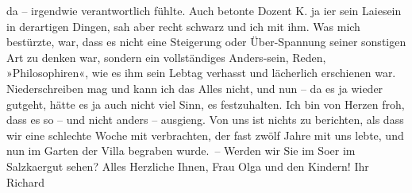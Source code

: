 \begin{ledgroupsized}[t]{13cm}
               da – irgendwie verantwortlich fühlte. Auch betonte Dozent K. ja i{\geminationm}er sein Laiesein in
               derartigen Dingen, sah aber recht schwarz {\pb}und ich mit ihm. Was mich
               bestürzte, war, dass es nicht eine Steigerung oder Über-Spannung seiner sonstigen Art
               zu denken war, sondern ein vollständiges Anders-sein, Reden, »Philosophiren«, wie es
               ihm sein Lebtag verhasst und lächerlich erschienen war. Niederschreiben mag und kann
               ich das Alles nicht, und nun – da es ja wieder gutgeht, hätte es ja auch nicht viel
               Sinn, es festzuhalten.\pend
           \pstart
           Ich bin von Herzen froh, dass es so – und nicht anders – ausgieng.\pend
           \pstart
           Von uns ist nichts zu berichten, als dass wir eine schlechte Woche mit \label{KLL02266_AS-1v}\label{KLL02266_AS-1h} verbrachten, der fast zwölf Jahre mit uns lebte, und nun im Garten der Villa
               begraben wurde. –\pend
           \pstart
           Werden wir Sie im So{\geminationm}er im Salzka{\geminationm}ergut sehen?\pend
           \pstart
           Alles Herzliche Ihnen, Frau Olga und den Kindern! Ihr\pend
           \pstart \spacefill\mbox{Richard}\pend{}
         
         \endnumbering{}\end{ledgroupsized}  \newcommand{\dateiname}{L02266}\newcommand{\titel}{Richard Beer-Hofmann an Arthur Schnitzler, 18. 7. 1917}\newcommand{\editorInnen}{Martin Anton Müller und Gerd-Hermann Susen}
      